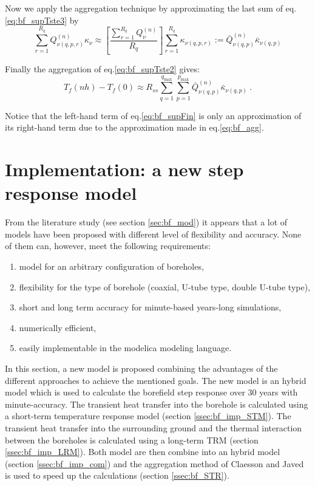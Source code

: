 \documentclass[a4paper,oneside,11pt]{report}
\begin{document}
{Now we apply the aggregation technique by approximating the last sum of eq.\ref{eq:bf_supTste3} by
\begin{equation} \label{eq:bf_agg}
  \sum_{r=1}^{R_q} Q_{\nu(q,p,r)}^{(n)} \kappa_{\nu} \approx \left[ \frac{\sum_{r=1}^{R_q} Q_{\nu}^{(n)}}{R_q} \right] \sum_{r=1}^{R_q} \kappa_{\nu(q,p,r)} := \bar{Q}_{\nu(q,p)}^{(n)} \bar{\kappa}_{\nu(q,p)}
\end{equation}

Finally the aggregation of eq.\ref{eq:bf_supTste2} gives:
\begin{equation} \label{eq:bf_supFin}
\boxed{
  T_f(n h) - T_f(0) \approx R_{ss} \sum_{q=1}^{ q_{\text{max}} } \sum_{p=1}^{p_{\text{max}}} \bar{Q}_{\nu(q,p)}^{(n)} \bar{\kappa}_{\nu(q,p)} \ .
}
\end{equation}

Notice that the left-hand term of eq.\ref{eq:bf_supFin} is only an approximation of its right-hand term due to the approximation made in eq.\ref{eq:bf_agg}.


 		
\section{Implementation: a new step response model} \label{sec:bf_imp}

From the literature study (see section \ref{sec:bf_mod}) it appears that a lot of models have been proposed with different level of flexibility and accuracy. None of them can, however, meet the following requirements:
\begin{enumerate}
	\item model for an arbitrary configuration of boreholes,
	\item flexibility for the type of borehole (coaxial, U-tube type, double U-tube type),
	\item short and long term accuracy for minute-based years-long simulations,
	\item numerically efficient,
	\item easily implementable in the modelica modeling language.
\end{enumerate}

In this section, a new model is proposed combining the advantages of the different approaches to achieve the mentioned goals. The new model is an hybrid model which is used to calculate the borefield step response over 30 years with minute-accuracy. The transient heat transfer into the borehole is calculated using a short-term temperature response model (section \ref{ssec:bf_imp_STM}). The transient heat transfer into the surrounding ground and the thermal interaction between the boreholes is calculated using a long-term TRM (section \ref{ssec:bf_imp_LRM}). Both model are then combine into an hybrid model (section \ref{ssec:bf_imp_com}) and the aggregation method of Claesson and Javed is used to speed up the calculations (section \ref{ssec:bf_STR}).


}
\end{document}
